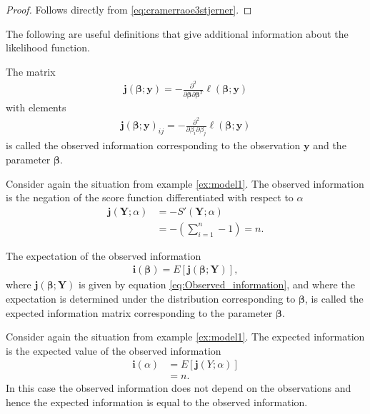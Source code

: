 \begin{proof}
Follows directly from \eqref{eq:cramerraoe3stjerner}.
\end{proof}
The following are useful definitions that give additional information about the likelihood function.
\begin{definition} 
\label{def:observed_information}
The matrix
\begin{align} \label{eq:Observed_information}
    \textbf{j}(\boldsymbol{\beta};\textbf{y}) = - \frac{\partial^2}{\partial \boldsymbol{\beta} \partial \boldsymbol{\beta}^T} \ell(\boldsymbol{\beta}; \textbf{y})
\end{align}
with elements
\begin{align*}
    \textbf{j}(\boldsymbol{\beta};\textbf{y})_{ij} = - \frac{\partial^2}{\partial \beta_i \partial \beta_j} \ell(\boldsymbol{\beta}; \textbf{y})
\end{align*}
is called the observed information corresponding to the observation $\textbf{y}$ and the parameter $\boldsymbol{\beta}$.
\end{definition}

\begin{example} \label{ex:Observed_information}
    Consider again the situation from example \ref{ex:model1}. The observed information is the negation of the score function differentiated with respect to $\alpha$
    \begin{align*}
        \textbf{j}\left( \textbf{Y}; \alpha \right) &= - S'\left(\textbf{Y}; \alpha \right)\\
        &=  - \left( \sum_{i = 1}^n -1\right) = n.
    \end{align*}
\end{example}

\begin{definition} 
\label{def:expected_information}
The expectation of the observed information 
\begin{align}
    \textbf{i}(\boldsymbol{\beta}) = E[\textbf{j}(\boldsymbol{\beta};\textbf{Y})],
\end{align}
where $\textbf{j}(\boldsymbol{\beta};\textbf{Y})$ is given by equation \eqref{eq:Observed_information}, and where the expectation is determined under the distribution corresponding to $\boldsymbol{\beta}$, is called the expected information matrix corresponding to the parameter $\boldsymbol{\beta}$.
\end{definition}

\begin{example}
Consider again the situation from example \ref{ex:model1}. The expected information is the expected value of the observed information
    \begin{align*}
        \textbf{i}\left(\alpha \right) &= E\left[\textbf{j}(Y;\alpha)\right]\\
        &= n.
    \end{align*}
    In this case the observed information does not depend on the observations and hence the expected information is equal to the observed information.
\end{example}

